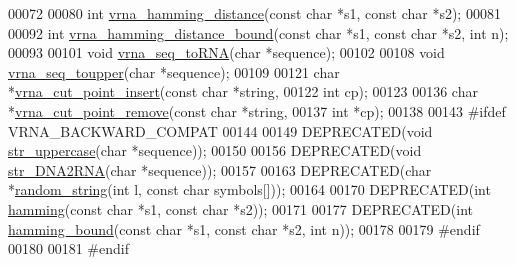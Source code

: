\begin{DoxyCode}
00072 
00080 \textcolor{keywordtype}{int} \hyperlink{group__string__utils_ga301798b43b6f66687985c725efd14f32}{vrna\_hamming\_distance}(\textcolor{keyword}{const} \textcolor{keywordtype}{char} *s1, \textcolor{keyword}{const} \textcolor{keywordtype}{char} *s2);
00081 
00092 \textcolor{keywordtype}{int} \hyperlink{group__string__utils_ga5d1c2271e79d9bcb52d4e68360763fb9}{vrna\_hamming\_distance\_bound}(\textcolor{keyword}{const} \textcolor{keywordtype}{char} *s1, \textcolor{keyword}{const} \textcolor{keywordtype}{char} *s2, \textcolor{keywordtype}{int} n);
00093 
00101 \textcolor{keywordtype}{void} \hyperlink{group__string__utils_gacfed92cba77064f6c743f9118d079bfc}{vrna\_seq\_toRNA}(\textcolor{keywordtype}{char} *sequence);
00102 
00108 \textcolor{keywordtype}{void} \hyperlink{group__string__utils_ga4f44dca03c9d708d68e64c0610bb9091}{vrna\_seq\_toupper}(\textcolor{keywordtype}{char} *sequence);
00109 
00121 \textcolor{keywordtype}{char} *\hyperlink{group__string__utils_ga74f05ece32ea73b59f84a7452afd5fae}{vrna\_cut\_point\_insert}(\textcolor{keyword}{const} \textcolor{keywordtype}{char} *\textcolor{keywordtype}{string},
00122                             \textcolor{keywordtype}{int} cp);
00123 
00136 \textcolor{keywordtype}{char} *\hyperlink{group__string__utils_ga1fbd821d4408cc5f1dd9d12c15e092cb}{vrna\_cut\_point\_remove}(\textcolor{keyword}{const} \textcolor{keywordtype}{char} *\textcolor{keywordtype}{string},
00137                             \textcolor{keywordtype}{int} *cp);
00138 
00143 \textcolor{preprocessor}{#ifdef  VRNA\_BACKWARD\_COMPAT}
00144 
00149 DEPRECATED(\textcolor{keywordtype}{void}  \hyperlink{string__utils_8h_a17b796b806f96b70382077fb5bc519bb}{str\_uppercase}(\textcolor{keywordtype}{char} *sequence));
00150 
00156 DEPRECATED(\textcolor{keywordtype}{void} \hyperlink{string__utils_8h_ad3f18dd83f958f18b2f26ecb99305208}{str\_DNA2RNA}(\textcolor{keywordtype}{char} *sequence));
00157 
00163 DEPRECATED(\textcolor{keywordtype}{char} *\hyperlink{string__utils_8h_a1b95eac365a021572e1c37e5993a89be}{random\_string}(\textcolor{keywordtype}{int} l, \textcolor{keyword}{const} \textcolor{keywordtype}{char} symbols[]));
00164 
00170 DEPRECATED(\textcolor{keywordtype}{int} \hyperlink{string__utils_8h_ad9dc7bfc9aa664dc6698f17ce07fc7e7}{hamming}(\textcolor{keyword}{const} \textcolor{keywordtype}{char} *s1, \textcolor{keyword}{const} \textcolor{keywordtype}{char} *s2));
00171 
00177 DEPRECATED(\textcolor{keywordtype}{int} \hyperlink{string__utils_8h_a96d3c36717d624514055ce201cab1542}{hamming\_bound}(\textcolor{keyword}{const} \textcolor{keywordtype}{char} *s1, \textcolor{keyword}{const} \textcolor{keywordtype}{char} *s2, \textcolor{keywordtype}{int} n));
00178 
00179 \textcolor{preprocessor}{#endif}
00180 
00181 \textcolor{preprocessor}{#endif}
\end{DoxyCode}
